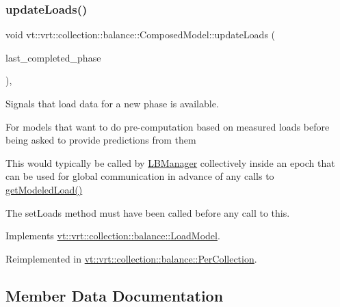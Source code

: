 \subsubsection{\texorpdfstring{update\+Loads()}{updateLoads()}}
{\footnotesize\ttfamily void vt\+::vrt\+::collection\+::balance\+::\+Composed\+Model\+::update\+Loads (\begin{DoxyParamCaption}\item[{\hyperlink{namespacevt_a46ce6733d5cdbd735d561b7b4029f6d7}{Phase\+Type}}]{last\+\_\+completed\+\_\+phase }\end{DoxyParamCaption})\hspace{0.3cm}{\ttfamily [override]}, {\ttfamily [virtual]}}



Signals that load data for a new phase is available. 

For models that want to do pre-\/computation based on measured loads before being asked to provide predictions from them

This would typically be called by \hyperlink{structvt_1_1vrt_1_1collection_1_1balance_1_1_l_b_manager}{L\+B\+Manager} collectively inside an epoch that can be used for global communication in advance of any calls to \hyperlink{classvt_1_1vrt_1_1collection_1_1balance_1_1_composed_model_a07737f979ebca207a76e6b810c386409}{get\+Modeled\+Load()}

The {\ttfamily set\+Loads} method must have been called before any call to this. 

Implements \hyperlink{structvt_1_1vrt_1_1collection_1_1balance_1_1_load_model_a4f1c6fb5d7d7a0b147755f025b1d5f5c}{vt\+::vrt\+::collection\+::balance\+::\+Load\+Model}.



Reimplemented in \hyperlink{structvt_1_1vrt_1_1collection_1_1balance_1_1_per_collection_a2b41fbbe2b684654f8dbfd9207b77501}{vt\+::vrt\+::collection\+::balance\+::\+Per\+Collection}.



\subsection{Member Data Documentation}
\mbox{\label{classvt_1_1vrt_1_1collection_1_1balance_1_1_composed_model_a8a2a6b2d5e79a7c02002132913c9ae55}} 
